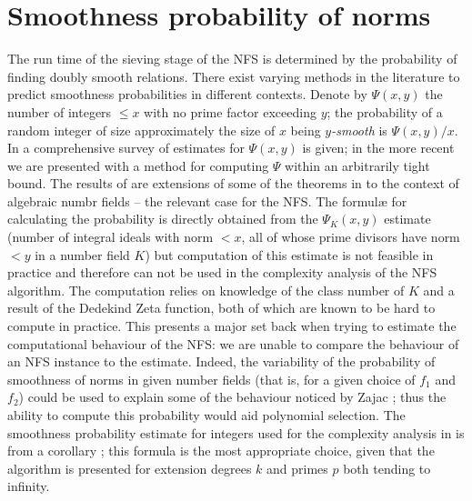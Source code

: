 \documentclass[a4paper, 10pt, envcountsect, runningheads]{article}
\numberwithin{figure}{section}
\numberwithin{equation}{section}
\begin{document}
\section{Smoothness probability of norms}
\label{s:smooth}
The run time of the sieving stage of the NFS is determined by the probability of finding doubly smooth relations. There exist varying methods in the literature to predict smoothness probabilities in different contexts.
Denote by $\Psi(x,y)$ the number of integers $\leq x$ with no prime factor exceeding $y$; the probability of a random integer of size approximately the size of $x$ being {\em $y$-smooth} is $\Psi(x,y)/x.$ 
In \cite{hild-tene} a comprehensive survey of estimates for $\Psi(x,y)$ is given; in the more recent \cite{dan_psi_est} we are presented with a method for computing $\Psi$ within an arbitrarily tight bound. The results of \cite{krause} are extensions of some of the theorems in \cite{hild-tene} to the context of algebraic numbr fields -- the relevant case for the NFS. The formul{\ae} for calculating the probability is directly obtained from the $\Psi_K(x,y)$ estimate (number of integral ideals with norm $< x$, all of whose prime divisors have norm $< y$ in a number field $K$) \cite[Satz 3]{krause} but computation of this estimate is not feasible in practice and therefore can not be used in the complexity analysis of the NFS algorithm. The computation relies on knowledge of the class number of $K$ and a result of the Dedekind Zeta function, both of which are known to be hard to compute in practice.
This presents a major set back when trying to estimate the computational behaviour of the NFS: we are unable to compare the behaviour of an NFS instance to the estimate. Indeed, the variability of the probability of smoothness of norms in given number fields (that is, for a given choice of $f_1$ and $f_2$) could be used to explain some of the behaviour noticed by Zajac \cite{zajac}; thus the ability to compute this probability would aid polynomial selection. 
The smoothness probability estimate for integers used for the complexity analysis in \cite{joux-lercier-smart-vercauteren06} is from a corollary \cite[page 15]{can-er-pom}; this formula is the most appropriate choice, given that the algorithm is presented for extension degrees $k$ and primes $p$ both tending to infinity. 
\end{document}
